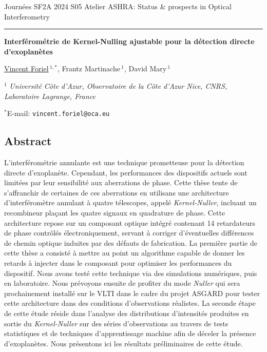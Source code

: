 \documentclass[12pt]{article}
\begin{document}
Journées SF2A 2024
\hfill
S05 Atelier ASHRA: Status \& prospects in Optical Interferometry

\smallskip
\hrule

\bigskip

\begin{center}
\LARGE \bf Interférométrie de Kernel-Nulling ajustable pour la détection directe d’exoplanètes\rm

\vspace{0.5cm}

\large  \underline{Vincent Foriel}$\,^{1,*}$, \large Frantz Martinache$\,^1$, \large David Mary$\,^1$

\vspace{0.5cm}

\normalsize

$^1$ \textit{Université Côte d’Azur, Observatoire de la Côte d’Azur Nice, CNRS, Laboratoire Lagrange, France}

\vspace{0.3cm}
$^*$E-mail: {\tt vincent.foriel@oca.eu}

\end{center}
\vspace{-0.8cm}
\subsection*{\Large Abstract}

L'interférométrie annulante est une technique prometteuse pour la détection directe d'exoplanète. Cependant, les performances des dispositifs actuels sont limitées par leur sensibilité aux aberrations de phase. Cette thèse tente de s'affranchir de certaines de ces aberrations en utilisans une architecture d'interféromètre annulant à quatre télescopes, appelé {\it Kernel-Nuller}\cite{Chingaipe et al. 2022}, incluant un recombineur plaçant les quatre signaux en quadrature de phase. Cette architecture repose sur un composant optique intégré contenant 14 retardateurs de phase contrôlés électroniquement, servant à corriger d'éventuelles différences de chemin optique induites par des défauts de fabrication. La première partie de cette thèse a consisté à mettre au point un algorithme capable de donner les retards à injecter dans le composant pour optimiser les performances du dispositif. Nous avons testé cette technique via des simulations numériques, puis en laboratoire. Nous prévoyons ensuite de profiter du mode {\it Nuller} qui sera prochainement installé sur le VLTI dans le cadre du projet ASGARD pour tester cette architecture dans des conditions d'observations réalistes. La seconde étape de cette étude réside dans l'analyse des distributions d'intensités produites en sortie du {\it Kernel-Nuller}\cite{Chingaipe et al. 2022, Cvetojevic et al. 2022} sur des séries d’observations au travers de tests statistiques et de techniques d’apprentissage machine afin de déceler la présence d'exoplanètes. Nous présentons ici les résultats préliminaires de cette étude.
\end{document}

